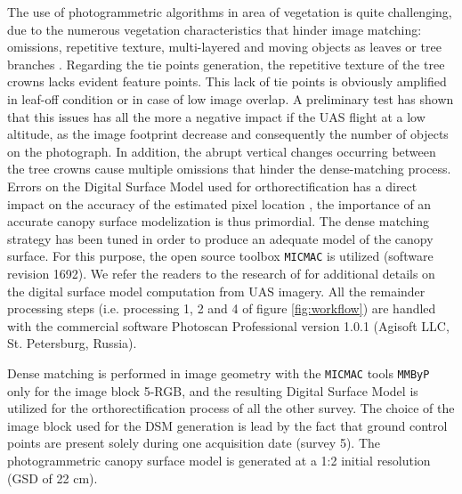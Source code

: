 \documentclass[remotesensing,article,submit,moreauthors,pdftex,12pt,a4paper]{mdpi} %
\begin{document}
The use of photogrammetric algorithms in area of vegetation is quite challenging, due to the numerous vegetation characteristics that hinder image matching: omissions, repetitive texture, multi-layered and moving objects as leaves or tree branches \cite{baltsavias_high-quality_2008}. 
Regarding the tie points generation, the repetitive texture of the tree crowns lacks evident feature points. 
This lack of tie points is obviously amplified in leaf-off condition or in case of low image overlap. 
A preliminary test has shown that this issues has all the more a negative impact if the UAS flight at a low altitude, as the image footprint decrease and consequently the number of objects on the photograph. 
In addition, the abrupt vertical changes occurring between the tree crowns cause multiple omissions that hinder the dense-matching process. 
Errors on the Digital Surface Model used for orthorectification has a direct impact on the accuracy of the estimated pixel location \cite{kempeneers_geometric_2013}, the importance of an accurate canopy surface modelization is thus primordial. 
The dense matching strategy has been tuned in order to produce an adequate model of the canopy surface. 
For this purpose, the open source toolbox {\tt MICMAC} \cite{pierrot-deseilligny_multiresolution_2006} is utilized (software revision 1692). 
We refer the readers to the research of \citeauthor{lisein_photogrammetric_2013} \cite{lisein_photogrammetric_2013} for additional details on the digital surface model computation from UAS imagery. 
All the remainder processing steps (i.e. processing 1, 2 and 4 of figure \ref{fig:workflow}) are handled with the commercial software Photoscan Professional version 1.0.1 (Agisoft LLC, St. Petersburg, Russia). 

Dense matching is performed in image geometry with the {\tt MICMAC} tools {\tt MMByP} only for the image block 5-RGB, and the resulting Digital Surface Model is utilized for the orthorectification process of all the other survey. 
The choice of the image block used for the DSM generation is lead by the fact that ground control points are present solely during one acquisition date (survey 5). 
The photogrammetric canopy surface model is generated at a 1:2 initial resolution (GSD of 22 cm).
\end{document}
